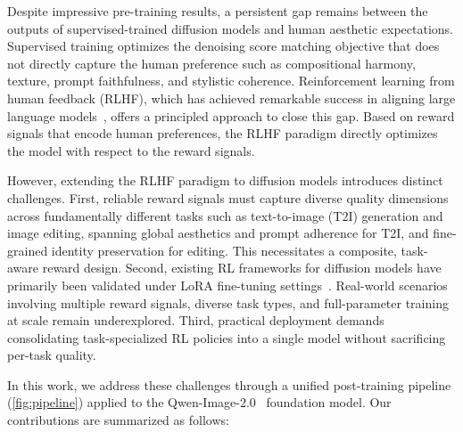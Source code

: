 \documentclass{article} %
\begin{document}
Despite impressive pre-training results, a persistent gap remains between the outputs of supervised-trained diffusion models and human aesthetic expectations. Supervised training optimizes the denoising score matching objective that does not directly capture the human preference such as compositional harmony, texture, prompt faithfulness, and stylistic coherence. Reinforcement learning from human feedback (RLHF), which has achieved remarkable success in aligning large language models~\citep{shao2024deepseekmath}, offers a principled approach to close this gap. Based on reward signals that encode human preferences, the RLHF paradigm directly optimizes the model with respect to the reward signals.

However, extending the RLHF paradigm to diffusion models introduces distinct challenges. First, reliable reward signals must capture diverse quality dimensions across fundamentally different tasks such as text-to-image (T2I) generation and image editing, spanning global aesthetics and prompt adherence for T2I, and fine-grained identity preservation for editing. This necessitates a composite, task-aware reward design. Second, existing RL frameworks for diffusion models have primarily been validated under LoRA fine-tuning settings~\citep{liu2025flowgrpo,zheng2025diffusionnft,wang2025grpo}. Real-world scenarios involving multiple reward signals, diverse task types, and full-parameter training at scale remain underexplored. Third, practical deployment demands consolidating task-specialized RL policies into a single model without sacrificing per-task quality.


In this work, we address these challenges through a unified post-training pipeline (\cref{fig:pipeline}) applied to the Qwen-Image-2.0~\citep{zhao2026qwen} foundation model. Our contributions are summarized as follows:
\end{document}
